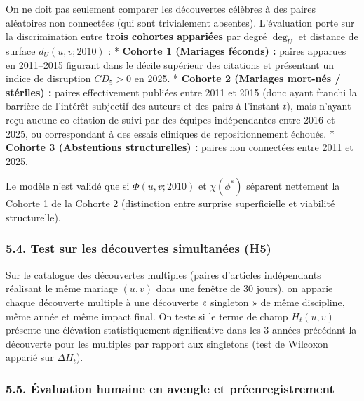 \documentclass[a4paper,11pt]{article}
\begin{document}
On ne doit pas seulement comparer les découvertes célèbres à des paires
aléatoires non connectées (qui sont trivialement absentes). L'évaluation
porte sur la discrimination entre \textbf{trois cohortes appariées} par
degré \(\deg_U\) et distance de surface \(d_U(u,v;2010)\) : *
\textbf{Cohorte 1 (Mariages féconds) :} paires apparues en 2011--2015
figurant dans le décile supérieur des citations et présentant un indice
de disruption \(CD_5 > 0\) en 2025. * \textbf{Cohorte 2 (Mariages
mort-nés / stériles) :} paires effectivement publiées entre 2011 et 2015
(donc ayant franchi la barrière de l'intérêt subjectif des auteurs et
des pairs à l'instant \(t\)), mais n'ayant reçu aucune co-citation de
suivi par des équipes indépendantes entre 2016 et 2025, ou correspondant
à des essais cliniques de repositionnement échoués. * \textbf{Cohorte 3
(Abstentions structurelles) :} paires non connectées entre 2011 et 2025.

Le modèle n'est validé que si \(\Phi(u,v;2010)\) et \(\chi(\phi^*)\)
séparent nettement la Cohorte 1 de la Cohorte 2 (distinction entre
surprise superficielle et viabilité structurelle).

\subsubsection*{5.4. Test sur les découvertes simultanées (H5)}

Sur le catalogue des découvertes multiples (paires d'articles
indépendants réalisant le même mariage \((u,v)\) dans une fenêtre de 30
jours), on apparie chaque découverte multiple à une découverte «
singleton » de même discipline, même année et même impact final. On
teste si le terme de champ \(H_t(u,v)\) présente une élévation
statistiquement significative dans les 3 années précédant la découverte
pour les multiples par rapport aux singletons (test de Wilcoxon apparié
sur \(\Delta H_t\)).

\subsubsection*{5.5. Évaluation humaine en aveugle et préenregistrement}
\end{document}
